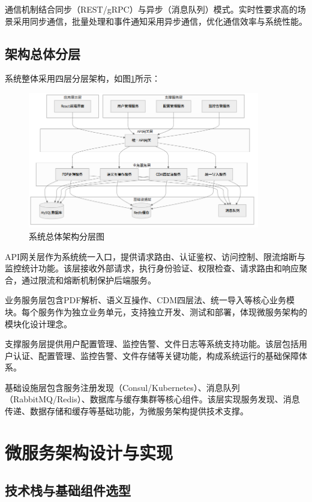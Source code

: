 通信机制结合同步（REST/gRPC）与异步（消息队列）模式。实时性要求高的场景采用同步通信，批量处理和事件通知采用异步通信，优化通信效率与系统性能。

\subsection{架构总体分层}

系统整体采用四层分层架构，如图\ref{fig:system_architecture}所示：

\begin{figure}[H]
    \centering
    \includegraphics[width=0.9\textwidth]{chapters/fig-0/system_architecture_simple.png}
    \caption{系统总体架构分层图}
    \label{fig:system_architecture}
\end{figure}

API网关层作为系统统一入口，提供请求路由、认证鉴权、访问控制、限流熔断与监控统计功能。该层接收外部请求，执行身份验证、权限检查、请求路由和响应聚合，通过限流和熔断机制保护后端服务。

业务服务层包含PDF解析、语义互操作、CDM四层法、统一导入等核心业务模块。每个服务作为独立业务单元，支持独立开发、测试和部署，体现微服务架构的模块化设计理念。

支撑服务层提供用户配置管理、监控告警、文件日志等系统支持功能。该层包括用户认证、配置管理、监控告警、文件存储等关键功能，构成系统运行的基础保障体系。

基础设施层包含服务注册发现（Consul/Kubernetes）、消息队列（RabbitMQ/Redis）、数据库与缓存集群等核心组件。该层实现服务发现、消息传递、数据存储和缓存等基础功能，为微服务架构提供技术支撑。

\section{微服务架构设计与实现}

\subsection{技术栈与基础组件选型}


